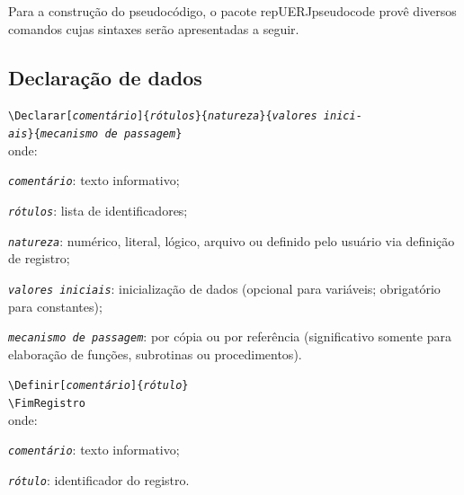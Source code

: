 \documentclass[a4paper,12pt,oneside,onecolumn,final,fleqn]{repUERJ}
\begin{document}
Para a construção do pseudocódigo, o pacote \textsf{repUERJpseudocode} provê diversos comandos cujas sintaxes serão apresentadas a seguir.

\subsection{Declaração de dados}

\begin{alinea}
  \item \texttt{\textbackslash Declarar[\textit{comentário}]\{\textit{rótulos}\}\{\textit{natureza}\}\{\textit{valores inici-}\\
        \textit{ais}\}\{\textit{mecanismo de passagem}\}}\\
        onde:
        \begin{alinea}
            \item \textit{\texttt{comentário}}: texto informativo;
            \item \textit{\texttt{rótulos}}: lista de
                  identificadores;
            \item \textit{\texttt{natureza}}: numérico, literal,
                  lógico, arquivo ou definido pelo usuário via
                  definição de registro;
            \item \textit{\texttt{valores iniciais}}: inicialização
                  de dados (opcional para variáveis; obrigatório
                  para constantes);
            \item \textit{\texttt{mecanismo de passagem}}: por cópia
                  ou por referência (significativo somente para
                  elaboração de funções, subrotinas ou
                  procedimentos).
    \end{alinea}
  \item \texttt{\textbackslash Definir[\textit{comentário}]\{\textit{rótulo}\}}\\
        \texttt{\textbackslash FimRegistro}\\
        onde:
        \begin{alinea}
            \item \textit{\texttt{comentário}}: texto informativo;
            \item \textit{\texttt{rótulo}}: identificador do registro.\\
        \end{alinea}
\end{alinea}
\end{document}
